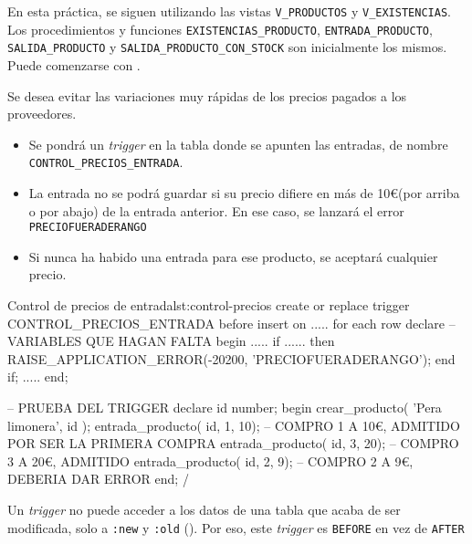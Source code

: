 En esta práctica, se siguen utilizando las vistas \texttt{V\_PRODUCTOS} y \texttt{V\_EXISTENCIAS}. Los procedimientos y funciones \texttt{EXISTENCIAS\_PRODUCTO}, \texttt{ENTRADA\_PRODUCTO}, \texttt{SALIDA\_PRODUCTO} y \texttt{SALIDA\_PRODUCTO\_CON\_STOCK} son inicialmente los mismos. Puede comenzarse con .

\newpage

\begin{homeworkProblem}

  Se desea evitar las variaciones muy rápidas de los precios pagados a los proveedores.
  \begin{itemize}
  \item Se pondrá un \textit{trigger} en la tabla donde se apunten las entradas, de nombre \texttt{CONTROL\_PRECIOS\_ENTRADA}.
  \item La entrada  no se podrá guardar si su precio difiere en más de 10\euro (por arriba o por abajo) de la entrada anterior. En ese caso, se lanzará el error \texttt{PRECIOFUERADERANGO}
  \item Si nunca ha habido una entrada para ese producto, se aceptará cualquier precio.
  \end{itemize}

\begin{listadosql}{Control de precios de entrada}{lst:control-precios}
create or replace trigger CONTROL_PRECIOS_ENTRADA
before insert on .....
for each row 
declare
  -- VARIABLES QUE HAGAN FALTA
begin
  .....
  if ...... then
    RAISE_APPLICATION_ERROR(-20200, 'PRECIOFUERADERANGO');
  end if;
.....
end;

-- PRUEBA DEL TRIGGER
declare
  id number;
begin
  crear_producto( 'Pera limonera', id );
  entrada_producto( id, 1, 10); -- COMPRO 1 A 10€, ADMITIDO POR SER LA PRIMERA COMPRA
  entrada_producto( id, 3, 20); -- COMPRO 3 A 20€, ADMITIDO
  entrada_producto( id, 2, 9); -- COMPRO 2 A 9€, DEBERIA DAR ERROR
end;
/
\end{listadosql}  

  \begin{Aviso}
    Un \textit{trigger} no puede acceder a los datos de una tabla que acaba de ser modificada, solo a \texttt{:new} y \texttt{:old} (). Por eso, este \textit{trigger} es \texttt{BEFORE} en vez de \texttt{AFTER}
  \end{Aviso}


\end{homeworkProblem}

